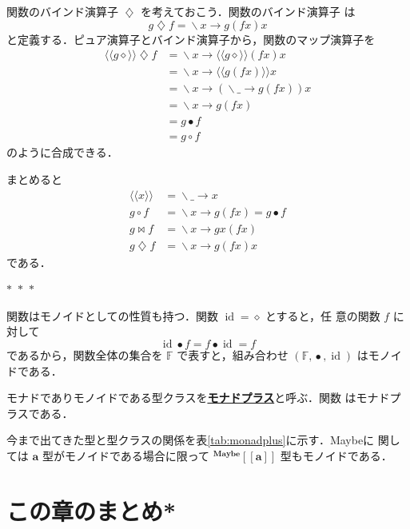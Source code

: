 \documentclass[a5paper,twoside,fleqn,draft]{jsbook}
\def\[{\left[\!\left[}
\def\]{\right]\!\right]}
\newcommand{\Langle}{\langle\!\langle}
\newcommand{\Rangle}{\rangle\!\rangle}
\newcommand{\separator}{\begin{center}$*$~$*$~$*$\end{center}}
\newcommand{\keyword}[1]{{\underline{\textbf{#1}}}}
\newcommand{\mAnyParam}{\_}
\newcommand{\mAnonParam}{\diamond}
\DeclareMathOperator{\mId}{id}
\DeclareMathOperator{\mAppMapFunc}{\bowtie}
\DeclareMathOperator{\mBindFunc}{\diamondsuit}
\DeclareMathOperator{\mComp}{\bullet} %
\DeclareMathOperator{\mLambda}{\backslash}
\DeclareMathOperator{\mLambdaArrow}{\rightarrow}
\DeclareMathOperator{\mMapFunc}{\circ}
\newcommand{\mSpecialSet}[1]{\mathbb{#1}} %
\newcommand{\mFSet}{\mSpecialSet{F}}
\newcommand{\mType}[1]{\mathbf{#1}}
\newcommand{\mGenericTypeAssemble}[2]{{}^{\mType{#1}}\[\mType{#2}\]}
\newcommand{\mMaybeType}[1]{\mGenericTypeAssemble{Maybe}{#1}}
\newcommand{\mFuncWith}[1]{\Langle#1\Rangle}
\newcommand{\mLambdaExp}[2]{\mLambda{#1}\mLambdaArrow{#2}}
\begin{document}
関数のバインド演算子 $\mBindFunc$ を考えておこう．関数のバインド演算子
は
\begin{equation}
g\mBindFunc f=\mLambdaExp{x}{g(fx)x}
\end{equation}
と定義する．ピュア演算子とバインド演算子から，関数のマップ演算子を
\begin{align}
\mFuncWith{g\mAnonParam}\mBindFunc f
&=\mLambdaExp{x}{\mFuncWith{g\mAnonParam}(fx)x}\\
&=\mLambdaExp{x}{\mFuncWith{g(fx)}x}\\
&=\mLambdaExp{x}{(\mLambdaExp{\mAnyParam}{g(fx)})x}\\
&=\mLambdaExp{x}{g(fx)}\\
&=g\mComp f\\
&=g\mMapFunc f
\end{align}
のように合成できる．

まとめると
\begin{align}
\mFuncWith{x}&=\mLambdaExp{\mAnyParam}{x}\\
g\mMapFunc f&=\mLambdaExp{x}{g(fx)}=g\mComp f\\
g\mAppMapFunc f&=\mLambdaExp{x}{gx(fx)}\\
g\mBindFunc f&=\mLambdaExp{x}{g(fx)x}
\end{align}
である．


\separator

関数はモノイドとしての性質も持つ．関数 $\mId=\mAnonParam$ とすると，任
意の関数 $f$ に対して
\begin{equation}
\mId\mComp f=f\mComp\mId=f
\end{equation}
であるから，関数全体の集合を $\mFSet$ で表すと，組み合わせ
$(\mFSet,\mComp,\mId)$ はモノイドである．

モナドでありモノイドである型クラスを\keyword{モナドプラス}と呼ぶ．関数
はモナドプラスである．

今まで出てきた型と型クラスの関係を表\ref{tab:monadplus}に示す．Maybeに
関しては $\mType{a}$ 型がモノイドである場合に限って $\mMaybeType{a}$
型もモノイドである．

\section{この章のまとめ*}
\end{document}
